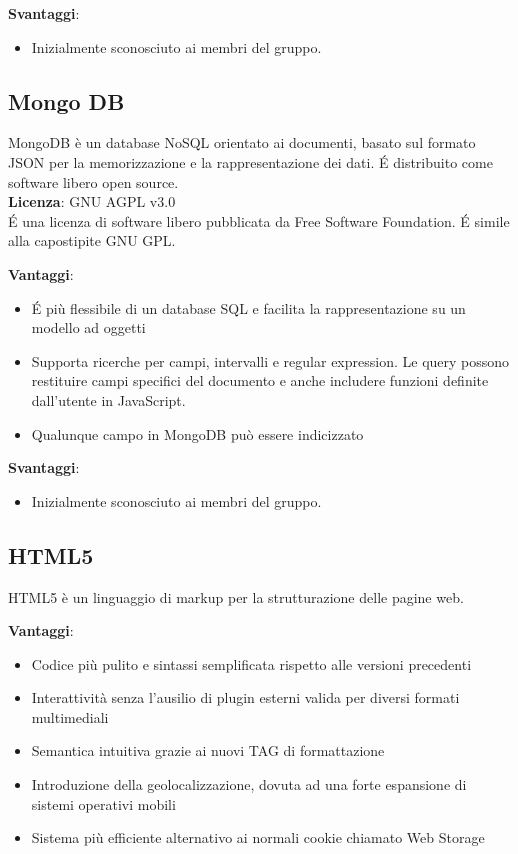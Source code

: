 \textbf{Svantaggi}: %
\begin{itemize}
	\item Inizialmente sconosciuto ai membri del gruppo.
\end{itemize}

\subsection{Mongo DB}
MongoDB è un database NoSQL orientato ai documenti, basato sul formato JSON per la memorizzazione e la rappresentazione dei dati. \'E distribuito come software libero open source. \\

\textbf{Licenza}: GNU AGPL v3.0 \\
\'E una licenza di software libero pubblicata da Free Software Foundation. \'E simile alla capostipite GNU GPL. 

\textbf{Vantaggi}: 
\begin{itemize}
	\item \'E più flessibile di un database SQL e facilita la rappresentazione su un modello ad
	oggetti
	\item Supporta ricerche per campi, intervalli e regular expression. Le query possono restituire campi specifici del documento e anche includere funzioni definite dall'utente in JavaScript.
	\item Qualunque campo in MongoDB può essere indicizzato 
\end{itemize}


\textbf{Svantaggi}: 
\begin{itemize}
	\item Inizialmente sconosciuto ai membri del gruppo.	
\end{itemize}

\subsection{HTML5}
HTML5 è un linguaggio di markup per la strutturazione delle pagine web.

\textbf{Vantaggi}: 
\begin{itemize}
	\item Codice più pulito e sintassi semplificata rispetto alle versioni precedenti
	\item Interattività senza l’ausilio di plugin esterni valida per diversi formati multimediali
	\item Semantica intuitiva grazie ai nuovi TAG di formattazione
	\item Introduzione della geolocalizzazione, dovuta ad una forte espansione di sistemi operativi mobili
	\item Sistema più efficiente alternativo ai normali cookie chiamato Web Storage 

\end{itemize}

